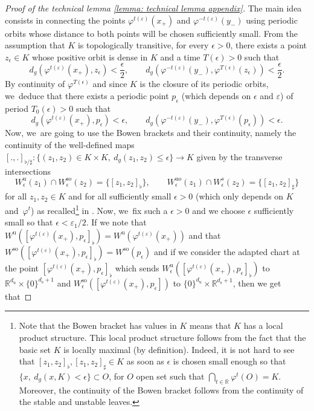 \documentclass[JEP,XML,SOM,Unicode,NoEqCountersInSection,NoFloatCountersInSection,published]{cedram}
\newcommand{\rs}{\mathrm{s}}
\newcommand{\rso}{\mathrm{so}}
\newcommand{\ru}{\mathrm{u}}
\newcommand{\ruo}{\mathrm{uo}}
\theoremstyle{definition}
\theoremstyle{plain}
\newcommand{\R}{\mathbb{R}}
\begin{document}
\begin{appendix}
\begin{proof}[Proof of the technical lemma \ref{lemma: technical lemma appendix}]
The main idea consists in connecting the points $\varphi^{ t (\varepsilon)} (x_+)$ and $\varphi^{ - t (\varepsilon)} (y_-)$ using periodic orbits whose distance to both points will be chosen sufficiently small. From the assumption that $K$ is topologically transitive, for every $\epsilon > 0$, there exists a point $z_{\epsilon} \in K$ whose positive orbit is dense in $K$ and a time $T (\epsilon) > 0$ such that
\[
d_g (\varphi^{ t (\varepsilon)} (x_+), z_{\epsilon}) < \frac{\epsilon}{2}, \qquad d_g (\varphi^{- t (\varepsilon)} (y_-), \varphi^{T (\epsilon)} (z_{\epsilon})) < \frac{\epsilon}{2}.
\]
By continuity of $\varphi^{T (\epsilon)}$ and since $K$ is the closure of its periodic orbits, we~deduce that there exists a periodic point $p_{\epsilon}$ (which depends on $\epsilon$ and $\varepsilon$) of period $T_0 (\epsilon) > 0$ such that
\[
d_g (\varphi^{ t (\varepsilon)} (x_+), p_{\epsilon}) < \epsilon, \qquad d_g (\varphi^{- t (\varepsilon)} (y_-), \varphi^{T (\epsilon)} (p_{\epsilon})) < \epsilon.
\]
Now, we~are going to use the Bowen brackets and their continuity, namely the continuity of the well-defined maps $[.,.]_{\flat / \sharp}: \{ (z_1,z_2) \in K \times K, \: d_g (z_1,z_2) \leq \epsilon\} \to K$ given by the transverse intersections
\[
W_{\epsilon}^{\ru} (z_1) \cap W_{\epsilon}^{\rso} (z_2) = \{[z_1,z_2]_{\flat} \}, \qquad W_{\epsilon}^{\ruo} (z_1) \cap W_{\epsilon}^{s} (z_2) = \{[z_1,z_2]_{\sharp} \}
\]
for all $z_1,z_2 \in K$ and for all sufficiently small $\epsilon > 0$ (which only depends on $K$ and~$\varphi^t$) as recalled\footnote{Note that the Bowen bracket has values in $K$ means that $K$ has a local product structure. This local product structure follows from the fact that the basic set $K$ is locally maximal (by definition). Indeed, it is not hard to see that $[z_1,z_2]_{\flat}, [z_1,z_2]_{\sharp} \in K$ as soon as $\epsilon$ is chosen small enough so that $\{x, \: d_g (x,K) < \epsilon \} \subset O$, for $O$ open set such that $\bigcap_{t \in \R} \varphi^t (O) = K$. Moreover, the continuity of the Bowen bracket follows from the continuity of the stable and unstable leaves.} in \cite[Prop.\,6.2.2]{FH}. Now, we~fix such a $\epsilon > 0$ and we choose $\epsilon$ sufficiently small so that $\epsilon < \varepsilon_1 /2$. If we note that $ W^{\ru} ([\varphi^{t (\varepsilon)} (x_+),p_{\epsilon}]_{\flat}) = W^{\ru} (\varphi^{t (\varepsilon)} (x_+))$ and that $ W^{\rso} ([\varphi^{t (\varepsilon)} (x_+),p_{\epsilon}]_{\flat}) = W^{\rso} (p_{\epsilon}) $ and if we consider the adapted chart at the point $[\varphi^{t (\varepsilon)} (x_+),p_{\epsilon}]_{\flat}$ which sends $ W_{\epsilon}^{\ru} ([\varphi^{t (\varepsilon)} (x_+),p_{\epsilon}]_{\flat})$ to $\R^{d_{\ru}} \times \{0\}^{d_\rs + 1}$ and $ W_{\epsilon}^{\rso} ([\varphi^{t (\varepsilon)} (x_+),p_{\epsilon}]) $ to $\{0\}^{d_{\ru}} \times \R^{d_\rs+ 1}$, then we get that

\end{proof}
\end{appendix}
\end{document}
